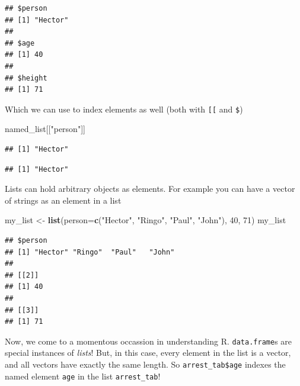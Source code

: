 \documentclass[12pt,]{book}
\newenvironment{Shaded}{\begin{snugshade}}{\end{snugshade}}
\newcommand{\KeywordTok}[1]{\textcolor[rgb]{0.13,0.29,0.53}{\textbf{#1}}}
\newcommand{\DataTypeTok}[1]{\textcolor[rgb]{0.13,0.29,0.53}{#1}}
\newcommand{\DecValTok}[1]{\textcolor[rgb]{0.00,0.00,0.81}{#1}}
\newcommand{\StringTok}[1]{\textcolor[rgb]{0.31,0.60,0.02}{#1}}
\newcommand{\OperatorTok}[1]{\textcolor[rgb]{0.81,0.36,0.00}{\textbf{#1}}}
\newcommand{\NormalTok}[1]{#1}
\theoremstyle{definition}
\theoremstyle{definition}
\theoremstyle{definition}
\theoremstyle{remark}
\begin{document}
\begin{verbatim}
## $person
## [1] "Hector"
## 
## $age
## [1] 40
## 
## $height
## [1] 71
\end{verbatim}

Which we can use to index elements as well (both with \texttt{{[}{[}}
and \texttt{\$})

\begin{Shaded}
\begin{Highlighting}[]
\NormalTok{named_list[[}\StringTok{"person"}\NormalTok{]]}
\end{Highlighting}
\end{Shaded}

\begin{verbatim}
## [1] "Hector"
\end{verbatim}

\begin{Shaded}
\end{Shaded}

\begin{verbatim}
## [1] "Hector"
\end{verbatim}

Lists can hold arbitrary objects as elements. For example you can have a
vector of strings as an element in a list

\begin{Shaded}
\begin{Highlighting}[]
\NormalTok{my_list <-}\StringTok{ }\KeywordTok{list}\NormalTok{(}\DataTypeTok{person=}\KeywordTok{c}\NormalTok{(}\StringTok{"Hector"}\NormalTok{, }\StringTok{"Ringo"}\NormalTok{, }\StringTok{"Paul"}\NormalTok{, }\StringTok{"John"}\NormalTok{), }\DecValTok{40}\NormalTok{, }\DecValTok{71}\NormalTok{)}
\NormalTok{my_list}
\end{Highlighting}
\end{Shaded}

\begin{verbatim}
## $person
## [1] "Hector" "Ringo"  "Paul"   "John"  
## 
## [[2]]
## [1] 40
## 
## [[3]]
## [1] 71
\end{verbatim}

Now, we come to a momentous occassion in understanding R.
\texttt{data.frame}s are special instances of \emph{lists}! But, in this
case, every element in the list is a vector, and all vectors have
exactly the same length. So \texttt{arrest\_tab\$age} indexes the named
element \texttt{age} in the list \texttt{arrest\_tab}!
\end{document}
